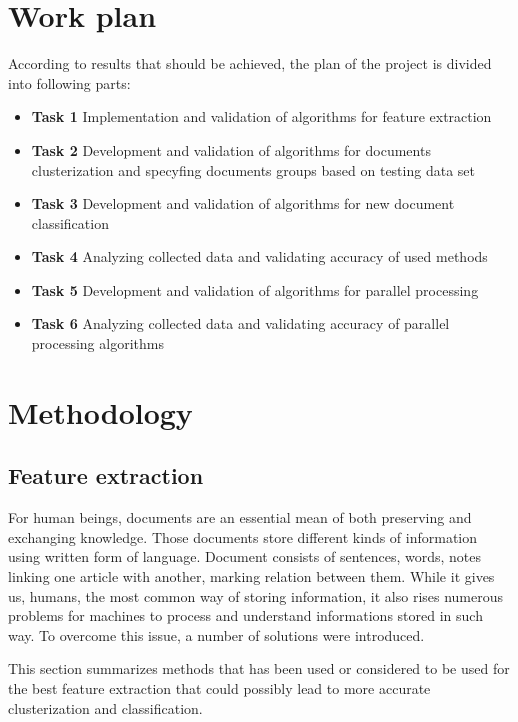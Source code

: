 \section{Work plan}

According to results that should be achieved, the plan of the project is divided into following parts:

\begin{itemize}
\item \textbf{Task 1} Implementation and validation of algorithms for feature extraction

\item  \textbf{Task 2} Development and validation of algorithms for documents clusterization and specyfing documents groups based on testing data set

\item  \textbf{Task 3} Development and validation of algorithms for
 new document classification

\item  \textbf{Task 4} Analyzing collected data and validating accuracy of used methods

\item \textbf{Task 5} Development and validation of algorithms for parallel processing 

\item  \textbf{Task 6} Analyzing collected data and validating accuracy of parallel processing algorithms
\end{itemize}

\section{Methodology}
\subsection{Feature extraction}
For human beings, documents are an essential mean of both preserving and exchanging knowledge. Those documents store different kinds of information using written form of language. Document consists of sentences, words, notes linking one article with another, marking relation between them. While it gives us, humans, the most common way of storing information, it also rises numerous problems for machines to process and understand informations stored in such way. To overcome this issue, a number of solutions were introduced.

This section summarizes methods that has been used or considered to be used for the best feature extraction that could possibly lead to more accurate clusterization and classification.

